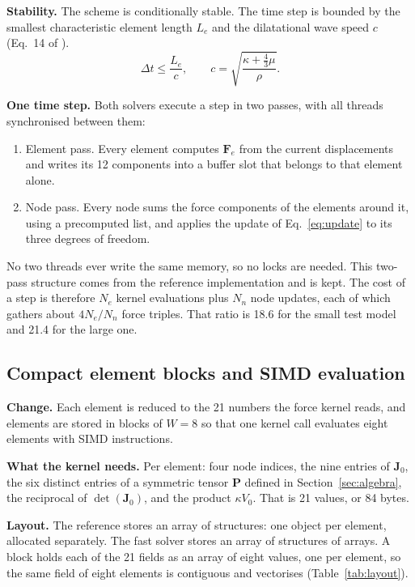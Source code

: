 \documentclass[11pt,a4paper]{article}
\newcommand{\mat}[1]{\mathbf{#1}}
\begin{document}
\textbf{Stability.} The scheme is conditionally stable. The time step is bounded by the smallest characteristic element length $L_e$ and the dilatational wave speed $c$ (Eq.~14 of \cite{zhang2021}).
\begin{equation}
\label{eq:stability}
\Delta t \le \frac{L_e}{c}, \qquad c = \sqrt{\frac{\kappa + \tfrac{4}{3}\mu}{\rho}}.
\end{equation}

\textbf{One time step.} Both solvers execute a step in two passes, with all threads synchronised between them:
\begin{enumerate}
\item Element pass. Every element computes $\mat{F}_e$ from the current displacements and writes its 12 components into a buffer slot that belongs to that element alone.
\item Node pass. Every node sums the force components of the elements around it, using a precomputed list, and applies the update of Eq.~\eqref{eq:update} to its three degrees of freedom.
\end{enumerate}
No two threads ever write the same memory, so no locks are needed. This two-pass structure comes from the reference implementation and is kept. The cost of a step is therefore $N_e$ kernel evaluations plus $N_n$ node updates, each of which gathers about $4N_e/N_n$ force triples. That ratio is 18.6 for the small test model and 21.4 for the large one.

\subsection{Compact element blocks and SIMD evaluation}
\label{sec:blocks}

\textbf{Change.} Each element is reduced to the 21 numbers the force kernel reads, and elements are stored in blocks of $W = 8$ so that one kernel call evaluates eight elements with SIMD instructions.

\textbf{What the kernel needs.} Per element: four node indices, the nine entries of $\mat{J}_0$, the six distinct entries of a symmetric tensor $\mat{P}$ defined in Section~\ref{sec:algebra}, the reciprocal of $\det(\mat{J}_0)$, and the product $\kappa V_0$. That is 21 values, or 84 bytes.

\textbf{Layout.} The reference stores an array of structures: one object per element, allocated separately. The fast solver stores an array of structures of arrays. A block holds each of the 21 fields as an array of eight values, one per element, so the same field of eight elements is contiguous and vectorises (Table~\ref{tab:layout}).
\end{document}

